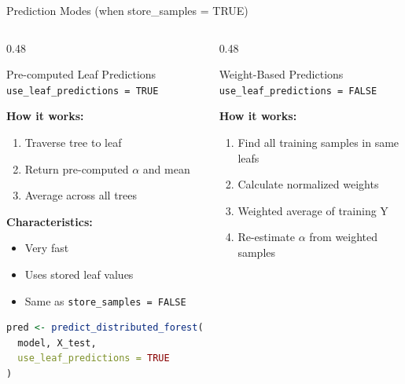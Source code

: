 \documentclass[aspectratio=169]{beamer}
\begin{document}
\begin{frame}[fragile]{Prediction Modes (when store\_samples = TRUE)}

\begin{columns}[T]

\begin{column}{0.48\textwidth}
\begin{block}{Pre-computed Leaf Predictions}
\texttt{use\_leaf\_predictions = TRUE}
\end{block}

\textbf{How it works:}
\begin{enumerate}
\item Traverse tree to leaf
\item Return pre-computed $\alpha$ and mean
\item Average across all trees
\end{enumerate}

\vspace{0.2cm}

\textbf{Characteristics:}
\begin{itemize}
\item Very fast
\item Uses stored leaf values
\item Same as \texttt{store\_samples = FALSE}
\end{itemize}

\vspace{0.2cm}

\begin{lstlisting}[language=R, basicstyle=\tiny\ttfamily]
pred <- predict_distributed_forest(
  model, X_test,
  use_leaf_predictions = TRUE
)
\end{lstlisting}

\end{column}

\begin{column}{0.48\textwidth}
\begin{block}{Weight-Based Predictions}
\texttt{use\_leaf\_predictions = FALSE}
\end{block}

\textbf{How it works:}
\begin{enumerate}
\item Find all training samples in same leafs
\item Calculate normalized weights
\item Weighted average of training Y
\item Re-estimate $\alpha$ from weighted samples
\end{enumerate}


\end{column}
\end{columns}
\end{frame}
\end{document}
